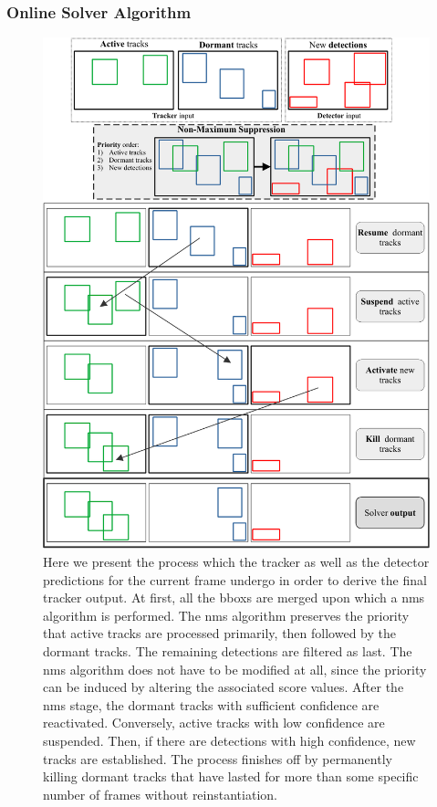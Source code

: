 \subsubsection{Online Solver Algorithm}

\begin{figure}[t]
    \centering
    \includegraphics[width=0.8\linewidth]{figures/methodology/siammot_online_solver.pdf}
    \caption[\siammot{} online solver]{Here we present the process which the tracker as well as the detector predictions for the current frame undergo in order to derive the final tracker output. At first, all the \glspl{bbox} are merged upon which a \gls{nms} algorithm is performed. The \gls{nms} algorithm preserves the priority that active tracks are processed primarily, then followed by the dormant tracks. The remaining detections are filtered as last. The \gls{nms} algorithm does not have to be modified at all, since the priority can be induced by altering the associated score values. After the \gls{nms} stage, the dormant tracks with sufficient confidence are reactivated. Conversely, active tracks with low confidence are suspended. Then, if there are detections with high confidence, new tracks are established. The process finishes off by permanently killing dormant tracks that have lasted for more than some specific number of frames without reinstantiation.}
    \label{fig:SiamMOTOnlineSolver}
\end{figure}

